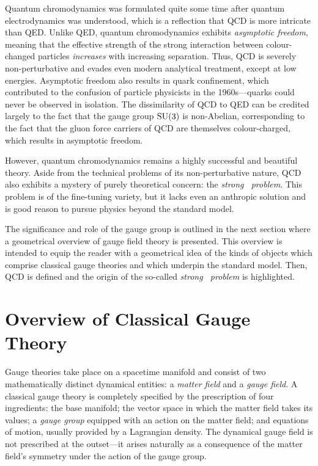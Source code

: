 Quantum chromodynamics was formulated quite some time after quantum electrodynamics was understood, which is a reflection that QCD is more intricate than QED.
Unlike QED, quantum chromodynamics exhibits \emph{asymptotic freedom}, meaning that the effective strength of the strong interaction between colour-changed particles \emph{increases} with increasing separation.
Thus, QCD is severely non-perturbative and evades even modern analytical treatment, except at low energies.
Asymptotic freedom also results in quark confinement, which contributed to the confusion of particle physicists in the 1960s---quarks could never be observed in isolation.
The dissimilarity of QCD to QED can be credited largely to the fact that the gauge group $\mathrm{SU}(3)$ is non-Abelian, corresponding to the fact that the gluon force carriers of QCD are themselves colour-charged, which results in asymptotic freedom.

However, quantum chromodynamics remains a highly successful and beautiful theory.
Aside from the technical problems of its non-perturbative nature, QCD also exhibits a mystery of purely theoretical concern: the \emph{strong \CP\ problem}.
This problem is of the fine-tuning variety, but it lacks even an anthropic solution and is good reason to pursue physics beyond the standard model.


The significance and role of the gauge group is outlined in the next section where a geometrical overview of gauge field theory is presented.
This overview is intended to equip the reader with a geometrical idea of the kinds of objects which comprise classical gauge theories and which underpin the standard model.
Then, QCD is defined and the origin of the so-called \emph{strong \CP\ problem} is highlighted.



\section{Overview of Classical Gauge Theory}
\label{sec:overview-of-gauge-theory}

Gauge theories take place on a spacetime manifold and consist of two mathematically distinct dynamical entities: a \emph{matter field} and a \emph{gauge field}.
A classical gauge theory is completely specified by the prescription of four ingredients: the base manifold; the vector space in which the matter field takes its values; a \emph{gauge group} equipped with an action on the matter field; and equations of motion, usually provided by a Lagrangian density.
The dynamical gauge field is not prescribed at the outset---it arises naturally as a consequence of the matter field's symmetry under the action of the gauge group.

